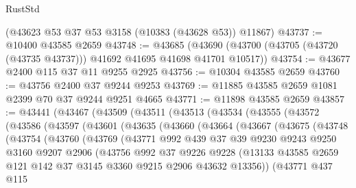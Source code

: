 \begin{lexlean}{RustStd}
\begin{coremodule}
    (@43623 @53 @37 @53 @3158 (@10383 (@43628 @53)) @11867)
@43737 := @10400 @43585 @2659
@43748 := @43685
    (@43690 (@43700 (@43705 (@43720 (@43735 @43737))) @41692 @41695 @41698 @41701 @10517))
@43754 := @43677 @2400 @115 @37 @11 @9255 @2925
@43756 := @10304 @43585 @2659
@43760 := @43756 @2400 @37 @9244 @9253
@43769 := @11885 @43585 @2659 @1081 @2399 @70 @37 @9244 @9251 @4665
@43771 := @11898 @43585 @2659
@43857 := @43441
    (@43467
      (@43509
        (@43511
          (@43513
            (@43534
              (@43555
                (@43572
                  (@43586
                    (@43597
                      (@43601
                        (@43635
                          (@43660
                            (@43664
                              (@43667
                                (@43675
                                  (@43748
                                    (@43754
                                      (@43760
                                        (@43769
                                          (@43771
                                            @992
                                            @439
                                            @37
                                            @39
                                            @9230
                                            @9243
                                            @9250
                                            @3160
                                            @9207
                                            @2906
                                            (@43756
                                              @992
                                              @37
                                              @9226
                                              @9228
                                              (@13133
                                                @43585
                                                @2659
                                                @121
                                                @142
                                                @37
                                                @3145
                                                @3360
                                                @9215
                                                @2906
                                                @43632
                                                @13356))
                                            (@43771
                                              @437
                                              @115

\end{coremodule}
\end{lexlean}

